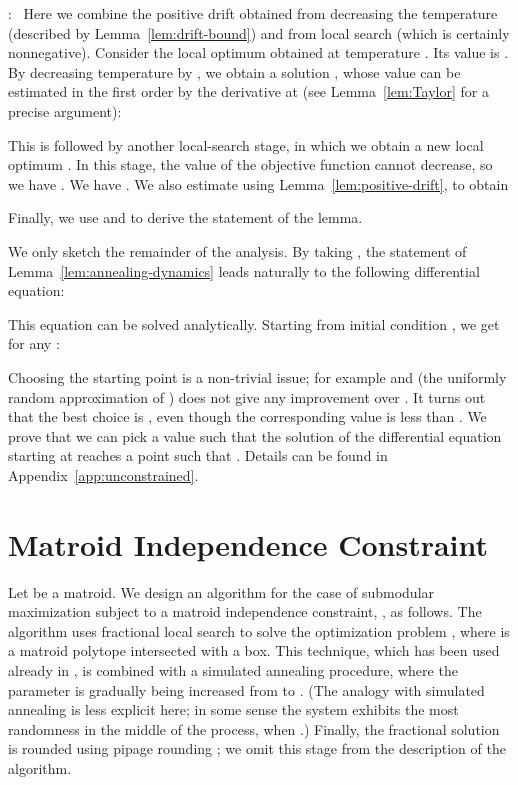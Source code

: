 \documentclass{article}[11pt]
\renewenvironment{proof}{\noindent{\bf Proof}:~}{\\}
\begin{document}
\begin{proof}
Here we combine the positive drift obtained from decreasing the temperature
(described by Lemma~\ref{lem:drift-bound})
and from local search (which is certainly nonnegative).
Consider the local optimum  obtained at temperature .
Its value is .
By decreasing temperature by , we obtain a solution ,
whose value can be estimated in the first order by the derivative at 
(see Lemma~\ref{lem:Taylor} for a precise argument):

This is followed by another local-search stage, in which we obtain a new local optimum .
In this stage, the value of the objective function cannot decrease, so we have
.
We have .
We also estimate  using Lemma~\ref{lem:positive-drift}, to obtain

Finally, we use  and 
to derive the statement of the lemma.
\end{proof}

We only sketch the remainder of the analysis. By taking ,
the statement of
Lemma~\ref{lem:annealing-dynamics} leads naturally to the following differential equation:

This equation can be solved analytically. Starting from initial condition ,
we get for any :
 
Choosing the starting point is a non-trivial issue; for example  and 
(the uniformly random approximation of \cite{FMV07}) does not give any improvement over .
It turns out that the best choice is ,
even though the corresponding value  is less than .  We prove that we can pick
a value  such that the solution of the differential equation starting at 
 reaches a point  such that .
Details can be found in Appendix~\ref{app:unconstrained}.




\section{Matroid Independence Constraint}
\label{sec:matroid-constraint}


Let  be a matroid.
We design an algorithm for the case of submodular maximization subject
to a matroid independence constraint, , as follows. The algorithm uses
fractional local search to solve the optimization problem ,
where  is a matroid polytope intersected with a box.
This technique, which has been used already in \cite{Vondrak09},
is combined with a simulated annealing procedure, where the parameter
 is gradually being increased from  to . (The analogy with simulated annealing
is less explicit here; in some sense the system exhibits the most randomness in the middle
of the process, when .)  Finally, the fractional solution is rounded
using pipage rounding \cite{CCPV07,Vondrak09}; we omit this stage from the description
of the algorithm.
\end{document}
